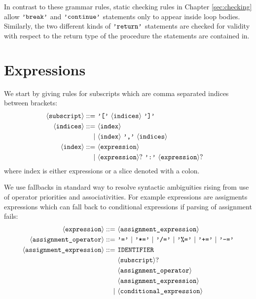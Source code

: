 \documentclass[a4paper, 10pt, draft]{report}
\newcommand{\litQuote}[1]{\textcolor{black}{\texttt{'#1'}}}
\newcommand{\grammarRules}[1]{\small{\singlespacing\vspace{-2em}\begin{align*}#1\end{align*}}}
\newcommand{\bnfNT}[1]{\ensuremath{\mathbf{\left\langle\mbox{\texttt{#1}}\right\rangle}}}
\newcommand{\bnfT}[1]{\ensuremath{\mbox{\litQuote{#1}}}}
\newcommand{\bnfM}[1]{\ensuremath{\mbox{\textcolor{black}{\texttt{\uppercase{#1}}}}}} %
\begin{document}
In contrast to these grammar rules, static checking rules in Chapter
\ref{sec:checking} allow \bnfT{break} and \bnfT{continue} statements only to
appear inside loop bodies. Similarly, the two different kinds of \bnfT{return}
statements are checked for validity with respect to the return type of the
procedure the statements are contained in.

\section{Expressions}\label{sec:grammar:expressions}

We start by giving rules for subscripts which are comma separated indices between brackets:
\grammarRules{
  \bnfNT{subscript} ::=&\ \bnfT{[}\ \bnfNT{indices}\ \bnfT{]} \\
  \bnfNT{indices}   ::=&\ \bnfNT{index}\\
                      |&\ \bnfNT{index}\ \bnfT{,}\ \bnfNT{indices}\\
  \bnfNT{index}     ::=&\ \bnfNT{expression} \\
                      |&\ \bnfNT{expression}?\ \bnfT{:}\ \bnfNT{expression}?&
}
where index is either expressions or a slice denoted with a colon.

We use fallbacks in standard way to resolve syntactic ambiguities rising from
use of operator priorities and associativities.  For example expressions are
assigments expressions which can fall back to conditional expressions if
parsing of assignment fails:
\grammarRules{
  \bnfNT{expression} ::=&\ \bnfNT{assignment\_expression} \\
  \bnfNT{assignment\_operator} ::=&\ \bnfT{=}\ |\ \bnfT{*=}\ |\ \bnfT{/=}\ |\ \bnfT{\%=}\ |\ \bnfT{+=}\ |\ \bnfT{-=} \\
  \bnfNT{assignment\_expression} ::=&\ \bnfM{IDENTIFIER}\\
                                    &\ \bnfNT{subscript}?\\
                                    &\ \bnfNT{assignment\_operator}\\
                                    &\ \bnfNT{assignment\_expression} \\
                                   |&\ \bnfNT{conditional\_expression}
}
\end{document}
